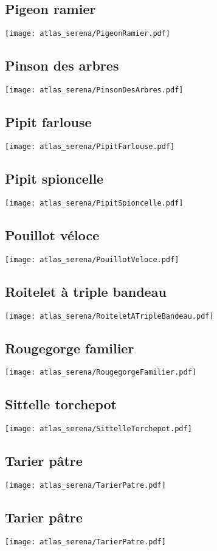 \subsection{Pigeon ramier}
\texttt{[image: atlas\_serena/PigeonRamier.pdf]}
\subsection{Pinson des arbres}
\texttt{[image: atlas\_serena/PinsonDesArbres.pdf]}
\subsection{Pipit farlouse}
\texttt{[image: atlas\_serena/PipitFarlouse.pdf]}
\subsection{Pipit spioncelle}
\texttt{[image: atlas\_serena/PipitSpioncelle.pdf]}
\subsection{Pouillot véloce}
\texttt{[image: atlas\_serena/PouillotVeloce.pdf]}
\subsection{Roitelet à triple bandeau}
\texttt{[image: atlas\_serena/RoiteletATripleBandeau.pdf]}
\subsection{Rougegorge familier}
\texttt{[image: atlas\_serena/RougegorgeFamilier.pdf]}
\subsection{Sittelle torchepot}
\texttt{[image: atlas\_serena/SittelleTorchepot.pdf]}
\subsection{Tarier pâtre}
\texttt{[image: atlas\_serena/TarierPatre.pdf]}
\subsection{Tarier pâtre}
\texttt{[image: atlas\_serena/TarierPatre.pdf]}
